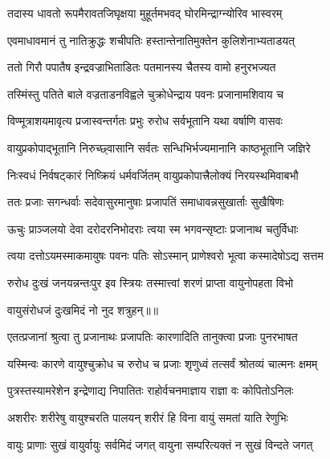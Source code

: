 \twolineshloka
{तदास्य धावतो रूपमैरावतजिघृक्षया}
{मुहूर्तमभवद् घोरमिन्द्राग्न्योरिव भास्वरम्} %

\twolineshloka
{एवमाधावमानं तु नातिक्रुद्धः शचीपतिः}
{हस्तान्तेनातिमुक्तेन कुलिशेनाभ्यताडयत्} %

\twolineshloka
{ततो गिरौ पपातैष इन्द्रवज्राभिताडितः}
{पतमानस्य चैतस्य वामो हनुरभज्यत} %

\twolineshloka
{तस्मिंस्तु पतिते बाले वज्रताडनविह्वले}
{चुक्रोधेन्द्राय पवनः प्रजानामशिवाय च} %

\twolineshloka
{विण्मूत्राशयमावृत्य प्रजास्वन्तर्गतः प्रभुः}
{रुरोध सर्वभूतानि यथा वर्षाणि वासवः} %

\twolineshloka
{वायुप्रकोपाद्भूतानि निरुच्छ्वासानि सर्वतः}
{सन्धिभिर्भज्यमानानि काष्ठभूतानि जज्ञिरे} %

\twolineshloka
{निःस्वधं निर्वषट्कारं निष्क्रियं धर्मवर्जितम्}
{वायुप्रकोपात्त्रैलोक्यं निरयस्थमिवाबभौ} %

\twolineshloka
{ततः प्रजाः सगन्धर्वाः सदेवासुरमानुषाः}
{प्रजापतिं समाधावन्नसुखार्ताः सुखैषिणः} %

\twolineshloka
{ऊचुः प्राञ्जलयो देवा दरोदरनिभोदराः}
{त्वया स्म भगवन्सृष्टाः प्रजानाथ चतुर्विधाः} %

\twolineshloka
{त्वया दत्तोऽयमस्माकमायुषः पवनः पतिः}
{सोऽस्मान् प्राणेश्वरो भूत्वा कस्मादेषोऽद्य सत्तम} %

\twolineshloka
{रुरोध दुःखं जनयन्नन्तःपुर इव स्त्रियः}
{तस्मात्त्वां शरणं प्राप्ता वायुनोपहता विभो} %

{वायुसंरोधजं दुःखमिदं नो नुद शत्रुहन्॥॥} %

\addtocounter{shlokacount}{1}

\twolineshloka
{एतत्प्रजानां श्रुत्वा तु प्रजानाथः प्रजापतिः}
{कारणादिति तानुक्त्वा प्रजाः पुनरभाषत} %

\twolineshloka
{यस्मिन्वः कारणे वायुश्चुक्रोध च रुरोध च}
{प्रजाः शृणुध्वं तत्सर्वं श्रोतव्यं चात्मनः क्षमम्} %

\twolineshloka
{पुत्रस्तस्यामरेशेन इन्द्रेणाद्य निपातितः}
{राहोर्वचनमाज्ञाय राज्ञा वः कोपितोऽनिलः} %

\twolineshloka
{अशरीरः शरीरेषु वायुश्चरति पालयन्}
{शरीरं हि विना वायुं समतां याति रेणुभिः} %

\twolineshloka
{वायुः प्राणाः सुखं वायुर्वायुः सर्वमिदं जगत्}
{वायुना सम्परित्यक्तं न सुखं विन्दते जगत्} %

